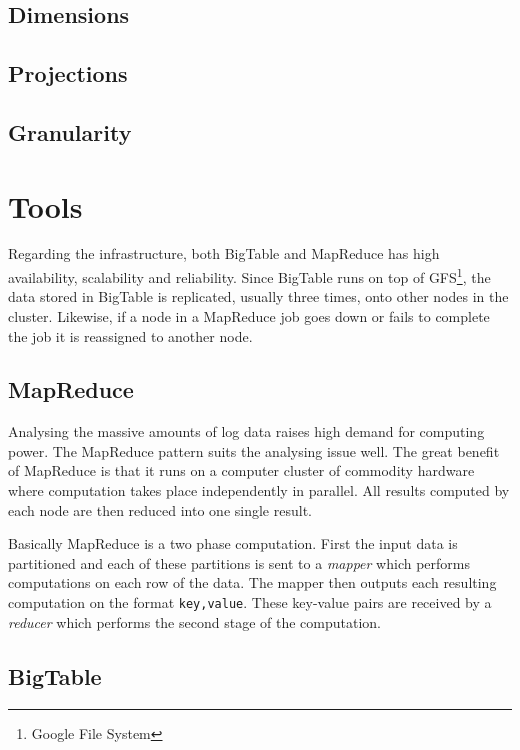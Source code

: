 \documentclass[a4paper,10pt]{book}
\begin{document}
\section{Dimensions}

\section{Projections}

\section{Granularity}



\chapter{Tools}

Regarding the infrastructure, both BigTable and MapReduce has high
availability, scalability and reliability. Since BigTable runs on top of
GFS\footnote{Google File System}, the data stored in BigTable is
replicated, usually three times, onto other nodes in the cluster.
\cite{gfs} Likewise, if a node in a MapReduce job goes down or fails to
complete the job it is reassigned to another node. \cite{mapreduce}


\section{MapReduce}

Analysing the massive amounts of log data raises high demand for computing
power. The MapReduce \cite{mapreduce} pattern suits the analysing issue
well. The great benefit of MapReduce is that it runs on a computer cluster
of commodity hardware where computation takes place independently in
parallel. All results computed by each node are then reduced into one
single result.

Basically MapReduce is a two phase computation. First the input data is
partitioned and each of these partitions is sent to a \textit{mapper} which
performs computations on each row of the data. The mapper then outputs each
resulting computation on the format \texttt{key,value}. These key-value
pairs are received by a \textit{reducer} which performs the second stage of
the computation.


\section{BigTable}
\end{document}
